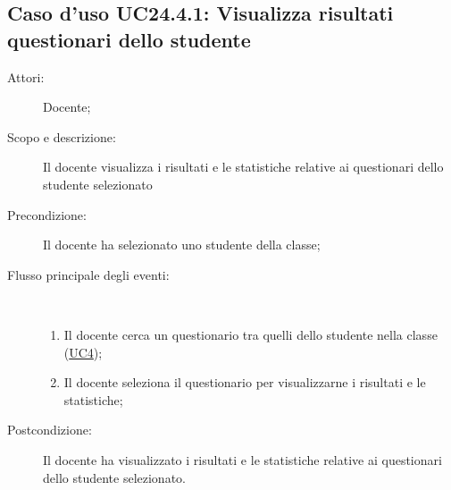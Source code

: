 \subsection{Caso d'uso UC24.4.1: Visualizza risultati questionari dello studente}\begin{description}
	\item[Attori:] Docente;
	\item[Scopo e descrizione:] Il docente visualizza i risultati e le statistiche relative ai questionari dello studente selezionato
	\item[Precondizione:] Il docente ha selezionato uno studente della classe;
	
	\item[Flusso principale degli eventi:] \ 
	\begin{enumerate}
		\item Il docente cerca un questionario tra quelli dello studente nella classe (\hyperlink{UC4}{UC4});
		\item Il docente seleziona il questionario per visualizzarne i risultati e le statistiche;
		
	\end{enumerate}
	\item[Postcondizione:] Il docente ha visualizzato i risultati e le statistiche relative ai questionari dello studente selezionato.
\end{description}
\hypertarget{UC25}{}
